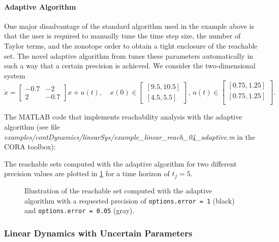 \paragraph{Adaptive Algorithm}

One major disadvantage of the standard algorithm used in the example above is that the user is required to manually tune the time step size, the number of Taylor terms, and the zonotope order to obtain a tight enclosure of the reachable set. The novel adaptive algorithm from \cite{Wetzlinger2020} tunes these parameters automatically in such a way that a certain precision is achieved. We consider the two-dimensional system
\begin{equation*}
    \dot{x}=\begin{bmatrix}
                -0.7 & -2 \\ 2 & -0.7
    \end{bmatrix}  x + u(t), \quad
    x(0)\in\begin{bmatrix} [9.5,10.5]
               \\ [4.5,5.5]
    \end{bmatrix}, \,
    u(t) \in
    \begin{bmatrix}
    [0.75,1.25]
        \\
        [0.75,1.25] \\
    \end{bmatrix}.
\end{equation*}

The MATLAB code that implements reachability analysis with the adaptive algorithm (see file \textit{examples/contDynamics/linearSys/example\_linear\_reach\_04\_adaptive.m} in the CORA toolbox):
    {\small
}

The reachable sets computed with the adaptive algorithm for two different precision values are plotted in \cref{fig:example_linear_reach_04_adaptive} for a time horizon of $t_f = 5$.

\begin{figure}[htb]
    \centering
    \footnotesize
    \caption{Illustration of the reachable set computed with the adaptive algorithm with a requested precision of \texttt{options.error = 1} (black) and \texttt{options.error = 0.05} (gray).}
    \label{fig:example_linear_reach_04_adaptive}
\end{figure}

\subsubsection{Linear Dynamics with Uncertain Parameters}

